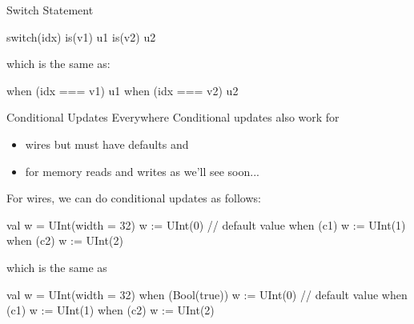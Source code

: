 \documentclass[xcolor=pdflatex,dvipsnames,table]{beamer}
\begin{document}
\begin{frame}[fragile]{Switch Statement}

\begin{scala}
switch(idx) {
  is(v1) { u1 }
  is(v2) { u2 }
}
\end{scala}

which is the same as:

\begin{scala}
when (idx === v1) { u1 }
when (idx === v2) { u2 }
\end{scala}

\end{frame}



\begin{frame}[fragile]{Conditional Updates Everywhere}
Conditional updates also work for 
\begin{itemize}
\item wires but must have defaults and
\item for memory reads and writes as we'll see soon...
\end{itemize}

For wires, we can do conditional updates as follows:

\begin{scala}
val w = UInt(width = 32)
w := UInt(0)                       // default value 
when (c1)         { w := UInt(1) }
when (c2)         { w := UInt(2) }
\end{scala}

\noindent
which is the same as

\begin{scala}
val w = UInt(width = 32)
when (Bool(true)) { w := UInt(0) } // default value
when (c1)         { w := UInt(1) }
when (c2)         { w := UInt(2) }
\end{scala}

\end{frame}
\end{document}
